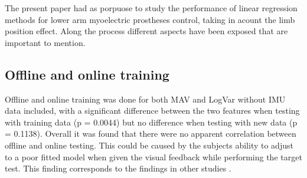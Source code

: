 The present paper had as porpuose to study the performance of linear regression methods for lower arm myoelectric prostheses control, taking in acount the limb position effect. Along the process different aspects have been exposed that are important to mention.\\




	\subsection{Offline and online training}
	Offline and online training was done for both MAV and LogVar without IMU data included, with a significant difference between the two features when testing with training data (p = 0.0044) but no difference when testing with new data (p = 0.1138). Overall it was found that there were no apparent correlation between offline and online testing. This could be caused by the subjects ability to adjust to a poor fitted model when given the visual feedback while performing the target test. This finding corresponds to the findings in other studies \cite{jiang2010}.
	
